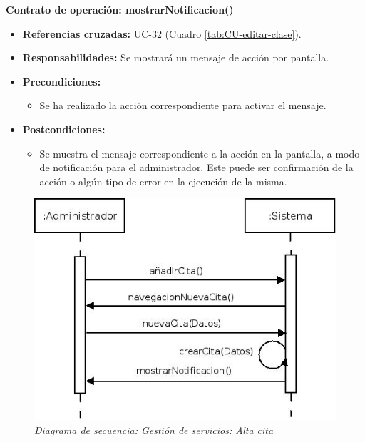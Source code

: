 \textbf{Contrato de operación: mostrarNotificacion()}
\begin{itemize}
\item \textbf{Referencias cruzadas:} UC-32 (Cuadro \ref{tab:CU-editar-clase}).
\item \textbf{Responsabilidades:} Se mostrará un mensaje de acción por pantalla.
\item \textbf{Precondiciones:} 
 \begin{itemize}
\item Se ha realizado la acción correspondiente para activar el mensaje.
\end {itemize}
\item \textbf{Postcondiciones:} 
 \begin{itemize}
\item Se muestra el mensaje correspondiente a la acción en la pantalla, a modo de notificación para el administrador. Este puede ser confirmación de la acción o algún tipo de error en la ejecución de la misma.
\end {itemize}
\end {itemize}


\vspace{10mm}

\begin{figure}
\centering
  \includegraphics[scale=.55]{img/secuencias/gestion-servicios-alta-cita.jpeg}
  \caption{\textit{Diagrama de secuencia: Gestión de servicios: Alta cita}}
  \label{fig:secuencia-gestion-servicios-alta-cita}
\end{figure}

